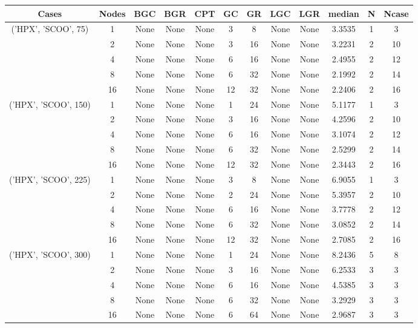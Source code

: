 \begin{tabular}{cccccccccccc}
\hline
Cases & Nodes& BGC& BGR& CPT& GC& GR& LGC& LGR& median & N & Ncase \\
\hline
\multirow{5}{*}{('HPX', 'SCOO', 75)}& 1& None& None& None& 3& 8& None& None& 3.3535& 1& 3\\
& 2& None& None& None& 3& 16& None& None& 3.2231& 2& 10\\
& 4& None& None& None& 6& 16& None& None& 2.4955& 2& 12\\
& 8& None& None& None& 6& 32& None& None& 2.1992& 2& 14\\
& 16& None& None& None& 12& 32& None& None& 2.2406& 2& 16\\
\hline
\multirow{5}{*}{('HPX', 'SCOO', 150)}& 1& None& None& None& 1& 24& None& None& 5.1177& 1& 3\\
& 2& None& None& None& 3& 16& None& None& 4.2596& 2& 10\\
& 4& None& None& None& 6& 16& None& None& 3.1074& 2& 12\\
& 8& None& None& None& 6& 32& None& None& 2.5299& 2& 14\\
& 16& None& None& None& 12& 32& None& None& 2.3443& 2& 16\\
\hline
\multirow{5}{*}{('HPX', 'SCOO', 225)}& 1& None& None& None& 3& 8& None& None& 6.9055& 1& 3\\
& 2& None& None& None& 2& 24& None& None& 5.3957& 2& 10\\
& 4& None& None& None& 6& 16& None& None& 3.7778& 2& 12\\
& 8& None& None& None& 6& 32& None& None& 3.0852& 2& 14\\
& 16& None& None& None& 12& 32& None& None& 2.7085& 2& 16\\
\hline
\multirow{5}{*}{('HPX', 'SCOO', 300)}& 1& None& None& None& 1& 24& None& None& 8.2436& 5& 8\\
& 2& None& None& None& 3& 16& None& None& 6.2533& 3& 3\\
& 4& None& None& None& 6& 16& None& None& 4.5385& 3& 3\\
& 8& None& None& None& 6& 32& None& None& 3.2929& 3& 3\\
& 16& None& None& None& 6& 64& None& None& 2.9687& 3& 3\\
\hline
\end{tabular}
